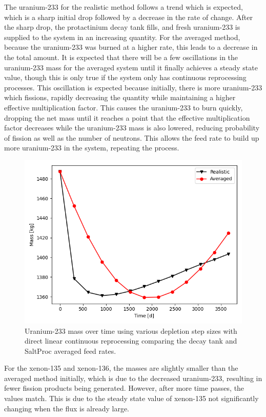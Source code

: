 The uranium-233 for the realistic method follows a trend which is expected, which is a sharp initial drop followed by a decrease in the rate of change. After the sharp drop, the protactinium decay tank fills, and fresh uranium-233 is supplied to the system in an increasing quantity. For the averaged method, because the uranium-233 was burned at a higher rate, this leads to a decrease in the total amount. It is expected that there will be a few oscillations in the uranium-233 mass for the averaged system until it finally achieves a steady state value, though this is only true if the system only has continuous reprocessing processes. This oscillation is expected because initially, there is more uranium-233 which fissions, rapidly decreasing the quantity while maintaining a higher effective multiplication factor. This causes the uranium-233 to burn quickly, dropping the net mass until it reaches a point that the effective multiplication factor decreases while the uranium-233 mass is also lowered, reducing probability of fission as well as the number of neutrons. This allows the feed rate to build up more uranium-233 in the system, repeating the process.

\begin{figure}[H]
  \centering
  \includegraphics[scale=0.7]{images/adv-U233.png}
  \caption{Uranium-233 mass over time using various depletion step sizes with direct linear continuous reprocessing comparing the decay tank and SaltProc averaged feed rates.}
   \label{fig:DL-cont-u-adv}
\end{figure}

For the xenon-135 and xenon-136, the masses are slightly smaller than the averaged method initially, which is due to the decreased uranium-233, resulting in fewer fission products being generated. However, after more time passes, the values match. This is due to the steady state value of xenon-135 not significantly changing when the flux is already large.

